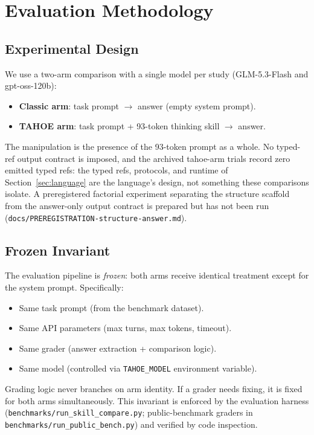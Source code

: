 \documentclass[11pt,a4paper]{article}
\begin{document}
\section{Evaluation Methodology}
\label{sec:methodology}

\subsection{Experimental Design}

We use a two-arm comparison with a single model per study (GLM-5.3-Flash and gpt-oss-120b):

\begin{itemize}[nosep,leftmargin=*]
    \item \textbf{Classic arm}: task prompt $\to$ answer (empty system prompt).
    \item \textbf{TAHOE arm}: task prompt + 93-token thinking skill $\to$ answer.
\end{itemize}

The manipulation is the presence of the 93-token prompt as a whole. No
typed-ref output contract is imposed, and the archived tahoe-arm trials
record zero emitted typed refs: the typed refs, protocols, and runtime of
Section~\ref{sec:language} are the language's design, not something these
comparisons isolate. A preregistered factorial experiment separating the
structure scaffold from the answer-only output contract is prepared but has
not been run (\texttt{docs/PREREGISTRATION-structure-answer.md}).

\subsection{Frozen Invariant}
\label{subsec:frozen}

The evaluation pipeline is \emph{frozen}: both arms receive identical treatment except for the system prompt.
Specifically:

\begin{itemize}[nosep,leftmargin=*]
    \item Same task prompt (from the benchmark dataset).
    \item Same API parameters (max turns, max tokens, timeout).
    \item Same grader (answer extraction + comparison logic).
    \item Same model (controlled via \texttt{TAHOE\_MODEL} environment variable).
\end{itemize}

Grading logic never branches on arm identity.
If a grader needs fixing, it is fixed for both arms simultaneously.
This invariant is enforced by the evaluation harness (\texttt{benchmarks/run\_skill\_compare.py}; public-benchmark graders in \texttt{benchmarks/run\_public\_bench.py}) and verified by code inspection.
\end{document}
